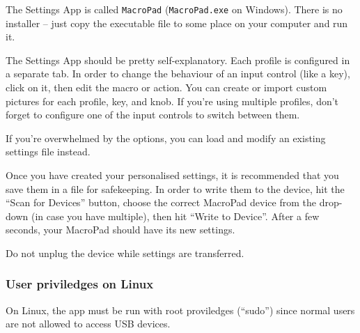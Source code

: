 \documentclass{article}
\newenvironment{note}{\begin{tcolorbox}[colback=blue!5!white,colframe=blue!75!black,title=\textbf{Note}]}{\end{tcolorbox}}
\begin{document}
The Settings App is called \lstinline[language=bash]{MacroPad} (\lstinline[language=bash]{MacroPad.exe} on Windows). There is no installer -- just copy the executable file to some place on your computer and run it.

The Settings App should be pretty self-explanatory. Each profile is configured in a separate tab. In order to change the behaviour of an input control (like a key), click on it, then edit the macro or action. You can create or import custom pictures for each profile, key, and knob.
If you're using multiple profiles, don't forget to configure one of the input controls to switch between them.

If you're overwhelmed by the options, you can load and modify an existing settings file instead.

Once you have created your personalised settings, it is recommended that you save them in a file for safekeeping.
In order to write them to the device, hit the ``Scan for Devices'' button, choose the correct MacroPad device from the drop-down (in case you have multiple), then hit ``Write to Device''. After a few seconds, your MacroPad should have its new settings.
\begin{note}
Do not unplug the device while settings are transferred.
\end{note}

\subsubsection{User priviledges on Linux}\label{sec:linux_priviledges}
On Linux, the app must be run with root proviledges (``sudo'') since normal users are not allowed to access USB devices.
\end{document}
